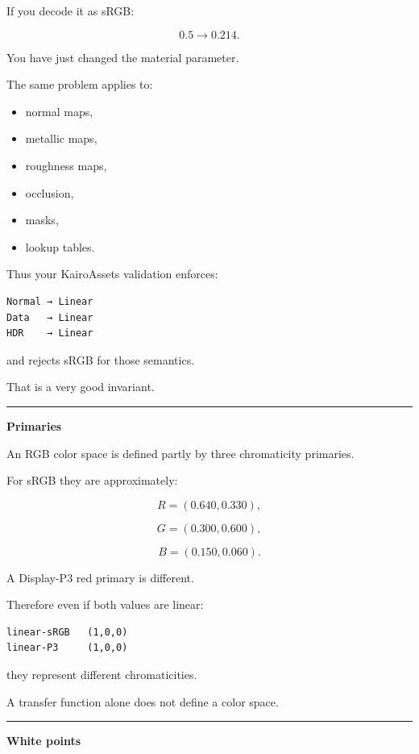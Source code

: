 If you decode it as sRGB:

\[
0.5\rightarrow0.214.
\]

You have just changed the material parameter.

The same problem applies to:

\begin{itemize}
\tightlist
\item
  normal maps,
\item
  metallic maps,
\item
  roughness maps,
\item
  occlusion,
\item
  masks,
\item
  lookup tables.
\end{itemize}

Thus your KairoAssets validation enforces:

\begin{verbatim}
Normal → Linear
Data   → Linear
HDR    → Linear
\end{verbatim}

and rejects sRGB for those semantics.

That is a very good invariant.

\begin{center}\rule{0.5\linewidth}{0.5pt}\end{center}

\textbf{Primaries}

An RGB color space is defined partly by three chromaticity primaries.

For sRGB they are approximately:

\[
R=(0.640,0.330),
\]

\[
G=(0.300,0.600),
\]

\[
B=(0.150,0.060).
\]

A Display-P3 red primary is different.

Therefore even if both values are linear:

\begin{verbatim}
linear-sRGB   (1,0,0)
linear-P3     (1,0,0)
\end{verbatim}

they represent different chromaticities.

A transfer function alone does not define a color space.

\begin{center}\rule{0.5\linewidth}{0.5pt}\end{center}

\textbf{White points}


